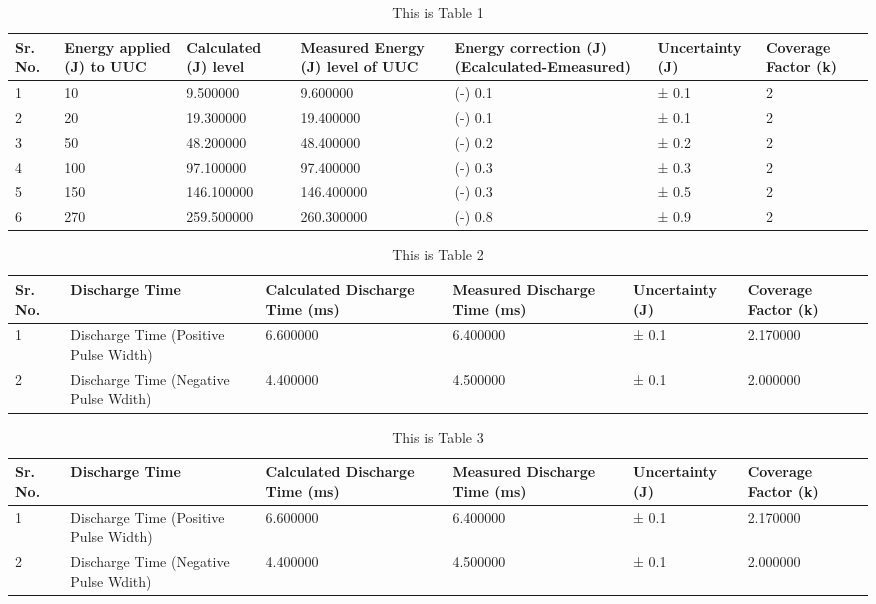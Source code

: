 \begin{table}
\caption{This is Table 1}
\begin{tabularx}{\textwidth}{|X|X|X|X|X|X|X|}

Sr. No. & Energy applied (J) to UUC & Calculated (J) level & Measured Energy (J) level of UUC & Energy correction (J) (Ecalculated-Emeasured) & Uncertainty (J) & Coverage Factor (k) \\ \hline

1 & 10 & 9.500000 & 9.600000 & (-) 0.1 & ± 0.1 & 2 \\ \hline
2 & 20 & 19.300000 & 19.400000 & (-) 0.1 & ± 0.1 & 2 \\ \hline
3 & 50 & 48.200000 & 48.400000 & (-) 0.2 & ± 0.2 & 2 \\ \hline
4 & 100 & 97.100000 & 97.400000 & (-) 0.3 & ± 0.3 & 2 \\ \hline
5 & 150 & 146.100000 & 146.400000 & (-) 0.3 & ± 0.5 & 2 \\ \hline
6 & 270 & 259.500000 & 260.300000 & (-) 0.8 & ± 0.9 & 2 \\ \hline

\end{tabularx}
\end{table}
\begin{table}
\caption{This is Table 2}
\begin{tabularx}{\textwidth}{|X|X|X|X|X|X|}

Sr. No. & Discharge Time & Calculated Discharge Time (ms) & Measured Discharge Time (ms) & Uncertainty (J) & Coverage Factor (k) \\ \hline

1 & Discharge Time (Positive Pulse Width) & 6.600000 & 6.400000 & ± 0.1 & 2.170000 \\ \hline
2 & Discharge Time (Negative Pulse Wdith) & 4.400000 & 4.500000 & ± 0.1 & 2.000000 \\ \hline

\end{tabularx}
\end{table}
\begin{table}
\caption{This is Table 3}
\begin{tabularx}{\textwidth}{|X|X|X|X|X|X|}

Sr. No. & Discharge Time & Calculated Discharge Time (ms) & Measured Discharge Time (ms) & Uncertainty (J) & Coverage Factor (k) \\ \hline

1 & Discharge Time (Positive Pulse Width) & 6.600000 & 6.400000 & ± 0.1 & 2.170000 \\ \hline
2 & Discharge Time (Negative Pulse Wdith) & 4.400000 & 4.500000 & ± 0.1 & 2.000000 \\ \hline

\end{tabularx}
\end{table}
